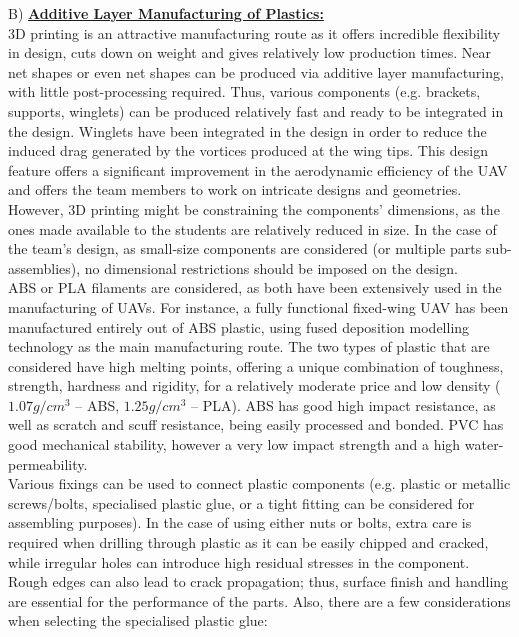 \documentclass[12pt]{article}
\begin{document}
B) \textbf{\underline{Additive Layer Manufacturing of Plastics: }}\\

\noindent 3D printing is an attractive manufacturing route as it offers incredible flexibility in design, cuts down on weight and gives relatively low production times. Near net shapes or even net shapes can be produced via additive layer manufacturing, with little post-processing required. Thus, various components (e.g. brackets, supports, winglets) can be produced relatively fast and ready to be integrated in the design. Winglets have been integrated in the design in order to reduce the induced drag generated by the vortices produced at the wing tips. This design feature offers a significant improvement in the aerodynamic efficiency of the UAV and offers the team members to work on intricate designs and geometries. \\

\noindent However, 3D printing might be constraining the components' dimensions, as the ones made available to the students are relatively reduced in size. In the case of the team’s design, as small-size components are considered (or multiple parts sub-assemblies), no dimensional restrictions should be imposed on the design. \\

\noindent ABS or PLA filaments are considered, as both have been extensively used in the manufacturing of UAVs. For instance, a fully functional fixed-wing UAV has been manufactured entirely out of ABS plastic, using fused deposition modelling technology as the main manufacturing route. The two types of plastic that are considered have high melting points, offering a unique combination of toughness, strength, hardness and rigidity, for a relatively moderate price and low density ($1.07g/cm^3$ – ABS, $1.25g/cm^3$ – PLA). ABS has good high impact resistance, as well as scratch and scuff resistance, being easily processed and bonded. PVC has good mechanical stability, however a very low impact strength and a high water-permeability. \\

\noindent Various fixings can be used to connect plastic components (e.g. plastic or metallic screws/bolts, specialised plastic glue, or a tight fitting can be considered for assembling purposes). In the case of using either nuts or bolts, extra care is required when drilling through plastic as it can be easily chipped and cracked, while irregular holes can introduce high residual stresses in the component.  Rough edges can also lead to crack propagation; thus, surface finish and handling are essential for the performance of the parts. Also, there are a few considerations when selecting the specialised plastic glue: 
\end{document}
